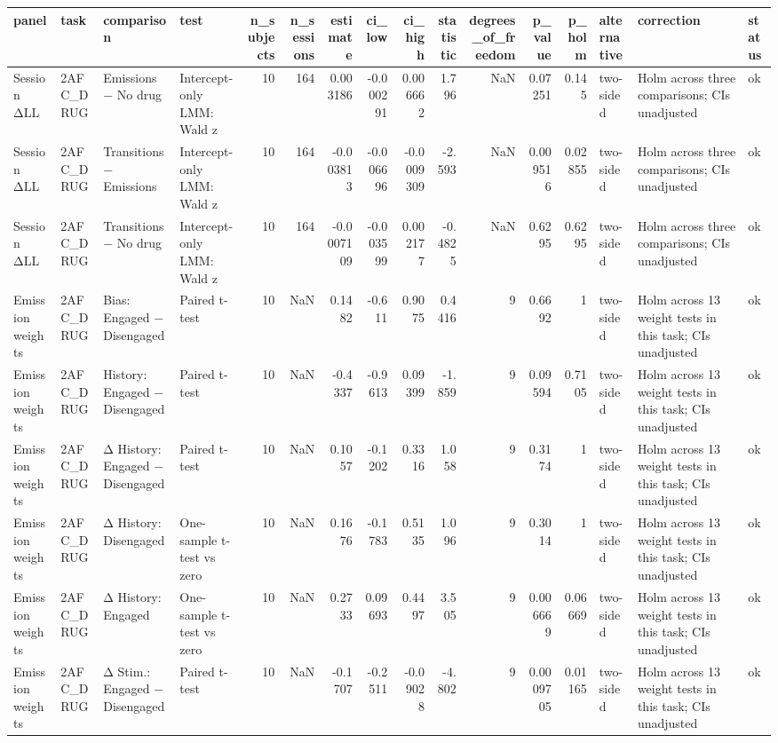 \begin{tabular}{llllrrrrrrrrrlll}
\toprule
panel & task & comparison & test & n\_subjects & n\_sessions & estimate & ci\_low & ci\_high & statistic & degrees\_of\_freedom & p\_value & p\_holm & alternative & correction & status \\
\midrule
Session ΔLL & 2AFC\_DRUG & Emissions − No drug & Intercept-only LMM: Wald z & 10 & 164 & 0.003186 & -0.000291 & 0.006662 & 1.796 & NaN & 0.07251 & 0.145 & two-sided & Holm across three comparisons; CIs unadjusted & ok \\
Session ΔLL & 2AFC\_DRUG & Transitions − Emissions & Intercept-only LMM: Wald z & 10 & 164 & -0.003813 & -0.006696 & -0.0009309 & -2.593 & NaN & 0.009516 & 0.02855 & two-sided & Holm across three comparisons; CIs unadjusted & ok \\
Session ΔLL & 2AFC\_DRUG & Transitions − No drug & Intercept-only LMM: Wald z & 10 & 164 & -0.0007109 & -0.003599 & 0.002177 & -0.4825 & NaN & 0.6295 & 0.6295 & two-sided & Holm across three comparisons; CIs unadjusted & ok \\
Emission weights & 2AFC\_DRUG & Bias: Engaged − Disengaged & Paired t-test & 10 & NaN & 0.1482 & -0.611 & 0.9075 & 0.4416 & 9 & 0.6692 & 1 & two-sided & Holm across 13 weight tests in this task; CIs unadjusted & ok \\
Emission weights & 2AFC\_DRUG & History: Engaged − Disengaged & Paired t-test & 10 & NaN & -0.4337 & -0.9613 & 0.09399 & -1.859 & 9 & 0.09594 & 0.7105 & two-sided & Holm across 13 weight tests in this task; CIs unadjusted & ok \\
Emission weights & 2AFC\_DRUG & Δ History: Engaged − Disengaged & Paired t-test & 10 & NaN & 0.1057 & -0.1202 & 0.3316 & 1.058 & 9 & 0.3174 & 1 & two-sided & Holm across 13 weight tests in this task; CIs unadjusted & ok \\
Emission weights & 2AFC\_DRUG & Δ History: Disengaged & One-sample t-test vs zero & 10 & NaN & 0.1676 & -0.1783 & 0.5135 & 1.096 & 9 & 0.3014 & 1 & two-sided & Holm across 13 weight tests in this task; CIs unadjusted & ok \\
Emission weights & 2AFC\_DRUG & Δ History: Engaged & One-sample t-test vs zero & 10 & NaN & 0.2733 & 0.09693 & 0.4497 & 3.505 & 9 & 0.006669 & 0.06669 & two-sided & Holm across 13 weight tests in this task; CIs unadjusted & ok \\
Emission weights & 2AFC\_DRUG & Δ Stim.: Engaged − Disengaged & Paired t-test & 10 & NaN & -0.1707 & -0.2511 & -0.09028 & -4.802 & 9 & 0.0009705 & 0.01165 & two-sided & Holm across 13 weight tests in this task; CIs unadjusted & ok \\

\end{tabular}
